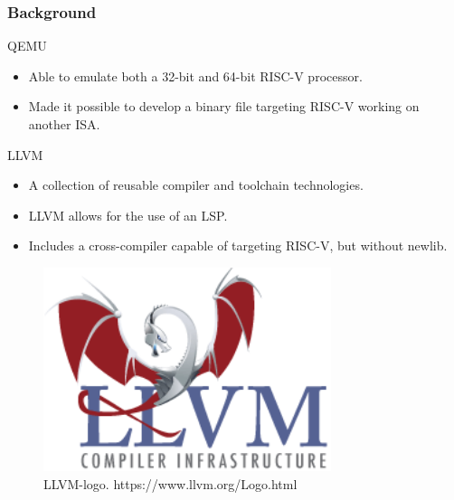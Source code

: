\begin{frame}[hoved]
	\frametitle{Background}
	\begin{minipage}[t]{0.45\textwidth}
		{\large QEMU}
		\begin{itemize}
			\item Able to emulate both a 32-bit and 64-bit RISC-V processor.
			\item Made it possible to develop a binary file targeting RISC-V working on
			      another ISA.
		\end{itemize}
		\vspace{0.5em}
		{\large LLVM}
		\begin{itemize}
			\item A collection of reusable compiler and toolchain technologies.
			\item LLVM allows for the use of an LSP.
			\item Includes a cross-compiler capable of targeting RISC-V, but without
			      newlib.
		\end{itemize}
	\end{minipage}
	\hfill
	\begin{minipage}[t]{0.45\textwidth}
		\begin{figure}
			\begin{center}
				\includegraphics[width=0.75\textwidth]{figures/LLVM-logo.png}
			\end{center}
			\caption{LLVM-logo.
				\tiny https://www.llvm.org/Logo.html}\label{fig:llvm-logo}
		\end{figure}
	\end{minipage}
\end{frame}

